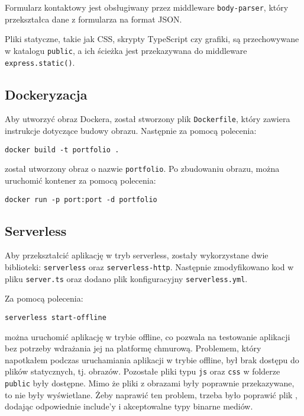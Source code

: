 \documentclass[a4paper,12pt]{article}
\begin{document}
Formularz kontaktowy jest obsługiwany przez middleware \texttt{body-parser}, który przekształca dane z formularza na format JSON.

Pliki statyczne, takie jak CSS, skrypty TypeScript czy grafiki, są przechowywane w katalogu \texttt{public}, a ich ścieżka jest przekazywana do middleware \texttt{express.static()}.

\subsection{Dockeryzacja}
Aby utworzyć obraz Dockera, został stworzony plik \texttt{Dockerfile}, który zawiera instrukcje dotyczące budowy obrazu. Następnie za pomocą polecenia:
\begin{lstlisting}
docker build -t portfolio .
\end{lstlisting}
został utworzony obraz o nazwie \texttt{portfolio}. Po zbudowaniu obrazu, można uruchomić kontener za pomocą polecenia:
\begin{lstlisting}
docker run -p port:port -d portfolio
\end{lstlisting}

\subsection{Serverless}
Aby przekształcić aplikację w tryb serverless, zostały wykorzystane dwie biblioteki: \texttt{serverless} oraz \texttt{serverless-http}. Następnie zmodyfikowano kod w pliku \texttt{server.ts} oraz dodano plik konfiguracyjny \texttt{serverless.yml}.

Za pomocą polecenia:
\begin{lstlisting}
serverless start-offline
\end{lstlisting}
można uruchomić aplikację w trybie offline, co pozwala na testowanie aplikacji bez potrzeby wdrażania jej na platformę chmurową. Problemem, który napotkałem podczas uruchamiania aplikacji w trybie offline, był brak dostępu do plików statycznych, tj. obrazów. Pozostałe pliki typu \texttt{js} oraz \texttt{css} w folderze \texttt{public} były dostępne. Mimo że pliki z obrazami były poprawnie przekazywane, to nie były wyświetlane. Żeby naprawić ten problem, trzeba było poprawić plik , dodając odpowiednie include'y i akceptowalne typy binarne mediów.
\end{document}

